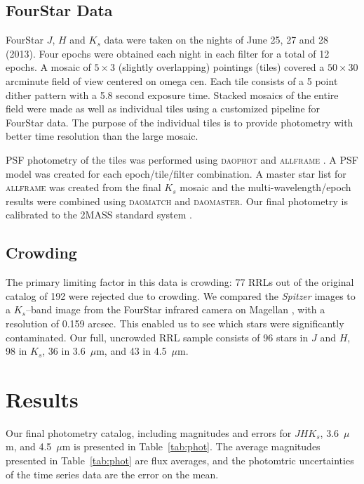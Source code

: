 \documentclass[a4paper,fleqn,usenatbib]{mnras}
\begin{document}
\subsection{FourStar Data}
\label{sec:fourstar_reduction}

FourStar $J$, $H$ and $K_s$ data were taken on the nights of June 25, 27 and 28 (2013).  Four epochs were obtained each night in each filter for a total of 12 epochs.  A mosaic of $5\times3$ (slightly overlapping) pointings (tiles) covered a $50\times30$ arcminute field of view centered on omega cen.  Each tile consists of a 5 point dither pattern with a 5.8 second exposure time.  Stacked mosaics of the entire field were made as well as individual tiles using a customized pipeline for FourStar data.  The purpose of the individual tiles is to provide photometry with better time resolution than the large mosaic.  

PSF photometry of the tiles was performed using \textsc{daophot} and \textsc{allframe} \citep{1987PASP...99..191S, 1994PASP..106..250S}. A PSF model was created for each epoch/tile/filter combination.  A master star list for \textsc{allframe} was created from the final $K_s$ mosaic and the multi-wavelength/epoch results were combined using \textsc{daomatch} and \textsc{daomaster}.  Our final photometry is calibrated to the 2MASS standard system \citep{2006AJ....131.1163S}. 

\subsection{Crowding}
\label{sec:crowding}

The primary limiting factor in this data is crowding: 77 RRLs out of the original catalog of 192 \citep{2004A&A...424.1101K} were rejected due to crowding. We compared the {\it Spitzer} images to a $K_s$--band image from the FourStar infrared camera on Magellan \citep{2013PASP..125..654P}, with a resolution of 0.159 arcsec. This enabled us to see which stars were significantly contaminated. Our full, uncrowded RRL sample consists of 96 stars in $J$ and $H$, 98 in $K_s$, 36 in 3.6~$\mu$m, and 43 in 4.5~$\mu$m.

\section{Results}
\label{sec:results}

Our final photometry catalog, including magnitudes and errors for $J\!H\!K_s$, 3.6~$\mu$m, and 4.5~$\mu$m is presented in Table~\ref{tab:phot}.
The average magnitudes presented in Table~\ref{tab:phot} are flux averages, and the photomtric uncertainties of the time series data are the error on the mean.
\end{document}
